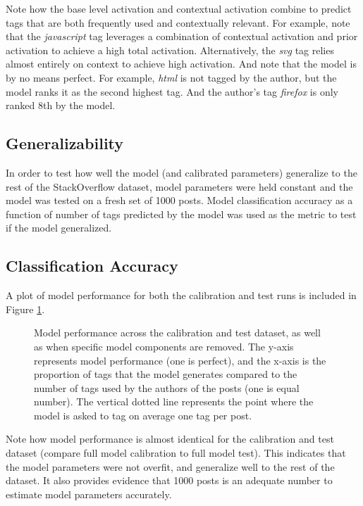 \documentclass[10pt,letterpaper]{article}
\begin{document}
Note how the base level activation and contextual activation combine to predict tags that are both frequently used and contextually relevant.
For example, note that the \emph{javascript} tag leverages a combination of contextual activation and prior activation to achieve a high total activation.
Alternatively, the \emph{svg} tag relies almost entirely on context to achieve high activation.
And note that the model is by no means perfect.
For example, \emph{html} is not tagged by the author, but the model ranks it as the second highest tag.
And the author's tag \emph{firefox} is only ranked 8th by the model.

\subsection{Generalizability}

In order to test how well the model (and calibrated parameters) generalize to the rest of the StackOverflow dataset,
model parameters were held constant and the model was tested on a fresh set of \num{1000} posts.
Model classification accuracy as a function of number of tags predicted by the model was used as the metric to test if the model generalized.

\subsection{Classification Accuracy}

A plot of model performance for both the calibration and test runs is included in Figure \ref{fig:ROC}.

\begin{figure}[ht]
  \centering
  \caption{
    Model performance across the calibration and test dataset, as well as when specific model components are removed.
    The y-axis represents model performance (one is perfect), and the x-axis is the proportion of tags that the model generates compared to the number of tags used by the authors of the posts (one is equal number).
    The vertical dotted line represents the point where the model is asked to tag on average one tag per post.
  }
  \label{fig:ROC}
\end{figure}

Note how model performance is almost identical for the calibration and test dataset (compare full model calibration to full model test).
This indicates that the model parameters were not overfit, and generalize well to the rest of the dataset.
It also provides evidence that \num{1000} posts is an adequate number to estimate model parameters accurately.
\end{document}
